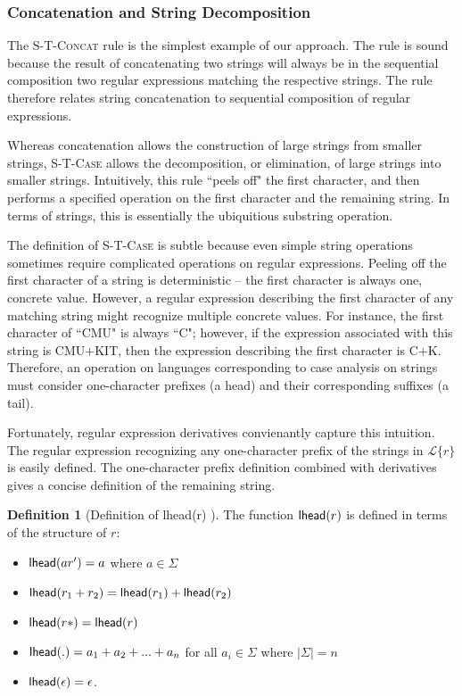 \documentclass[9pt]{sig-alternate}
\theoremstyle{definition}
\newtheorem{defn}[thm]{Definition}
\newcommand{\Lagr}{\mathcal{L}}
\newcommand{\lang}[1]{\Lagr\{#1\}}
\newcommand{\lhead}[1]{ {\sf lhead}(#1) }
\begin{document}
\subsubsection{Concatenation and String Decomposition}

The \textsc{S-T-Concat} rule is the simplest example of our approach. The rule is sound because the result of concatenating two strings will always be in the sequential composition two regular expressions matching the respective strings. The rule therefore relates string concatenation to sequential composition of regular expressions.

Whereas concatenation allows the construction of large strings from smaller strings, \textsc{S-T-Case} allows the decomposition, or elimination, of large strings into smaller strings. Intuitively, this rule ``peels off" the first character, and then performs a specified operation on the first character and the remaining string. In terms of strings, this is essentially the ubiquitious substring operation.

The definition of \textsc{S-T-Case} is subtle because even simple string operations sometimes require complicated operations on regular expressions. Peeling off the first character of a string is deterministic -- the first character is always one, concrete value. However, a regular expression describing the first character of any matching string might recognize multiple concrete values. For instance, the first character of ``CMU" is always ``C"; however, if the expression associated with this string is CMU$+$KIT, then the expression describing the first character is C$+$K.
Therefore, an operation on languages corresponding to case analysis on strings must consider one-character prefixes (a head) and their corresponding suffixes (a tail).

Fortunately, regular expression derivatives \cite{bowzer} convienantly capture this intuition.
The regular expression recognizing any one-character prefix of the strings in $\lang{r}$ is easily defined.
The one-character prefix definition combined with derivatives gives a concise definition of the
remaining string.

\begin{defn}[Definition of \lhead{r}]
The function $\lhead{r}$ is defined in terms of the structure of $r$:
\begin{itemize}
\item $\lhead{a r'} = a$ where $a \in \Sigma$
\item $\lhead{r_1 +  r_2}  = \lhead{r_1} + \lhead{r_2}$
\item $\lhead{r*} = \lhead{r}$
\item $\lhead{.} = a_1 + a_2 + ... + a_n$ for all $a_i \in \Sigma$ where $|\Sigma| = n$
\item $\lhead{\epsilon} = \epsilon$.
\end{itemize}
\end{defn}
\end{document}
